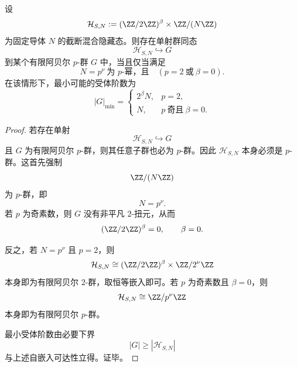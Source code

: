 \begin{theorem}\label{thm:conclusion-mixed-hidden-state-pprimary-faithful-receiver}
设
\[
\mathcal H_{S,N}:=(\ZZ/2\ZZ)^\beta\times \ZZ/(N\ZZ)
\]
为固定导体 \(N\) 的截断混合隐藏态。则存在单射群同态
\[
\mathcal H_{S,N}\hookrightarrow G
\]
到某个有限阿贝尔 \(p\)-群 \(G\) 中，当且仅当满足
\[
N=p^\nu\ \text{为 }p\text{-幂，且}\quad (p=2\ \text{或}\ \beta=0).
\]
在该情形下，最小可能的受体阶数为
\[
|G|_{\min}=
\begin{cases}
2^\beta N,& p=2,\\
N,& p\ \text{奇且}\ \beta=0.
\end{cases}
\]
\end{theorem}
\begin{proof}
若存在单射
\[
\mathcal H_{S,N}\hookrightarrow G
\]
且 \(G\) 为有限阿贝尔 \(p\)-群，则其任意子群也必为 \(p\)-群。因此 \(\mathcal H_{S,N}\) 本身必须是 \(p\)-群。这首先强制
\[
\ZZ/(N\ZZ)
\]
为 \(p\)-群，即
\[
N=p^\nu.
\]
若 \(p\) 为奇素数，则 \(G\) 没有非平凡 \(2\)-扭元，从而
\[
(\ZZ/2\ZZ)^\beta=0,
\qquad
\beta=0.
\]

反之，若 \(N=p^\nu\) 且 \(p=2\)，则
\[
\mathcal H_{S,N}\cong (\ZZ/2\ZZ)^\beta\times \ZZ/2^\nu\ZZ
\]
本身即为有限阿贝尔 \(2\)-群，取恒等嵌入即可。若 \(p\) 为奇素数且 \(\beta=0\)，则
\[
\mathcal H_{S,N}\cong \ZZ/p^\nu\ZZ
\]
本身即为有限阿贝尔 \(p\)-群。

最小受体阶数由必要下界
\[
|G|\ge |\mathcal H_{S,N}|
\]
与上述自嵌入可达性立得。证毕。
\end{proof}

